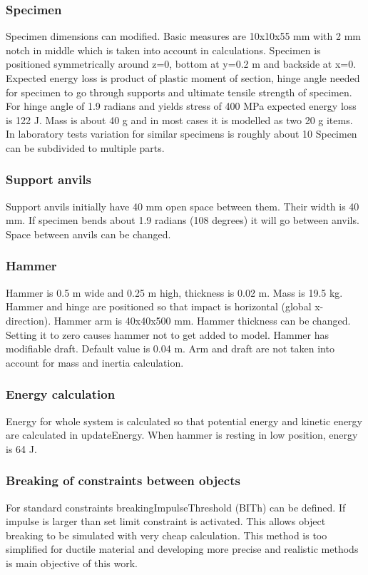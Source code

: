 \subsubsection{Specimen}
Specimen dimensions can modified. Basic measures are 10x10x55 mm with 2 mm notch in middle which is taken into account in calculations. Specimen is positioned symmetrically around z=0, bottom at y=0.2 m and backside at x=0. 
Expected energy loss is product of plastic moment of section, hinge angle needed for specimen to go through supports and 
ultimate tensile strength of specimen. For hinge angle of 1.9 radians and yields stress of 400 MPa expected energy 
loss is 122 J. Mass is about 40 g and in most cases it is modelled as two 20 g items. In laboratory tests variation for similar 
specimens is roughly about 10 %
Specimen can be subdivided to multiple parts.

\subsubsection{Support anvils}
Support anvils initially have 40 mm open space between them. Their width is 40 mm. 
If specimen bends about 1.9 radians (108 degrees) it will go between anvils. Space between anvils can be changed.

\subsubsection{Hammer}
Hammer is 0.5 m wide and 0.25 m high, thickness is 0.02 m. Mass is 19.5 kg. Hammer and hinge are positioned so that 
impact is horizontal  (global x-direction). Hammer arm is 40x40x500 mm. Hammer thickness can be changed.
Setting it to zero causes hammer not to get added to model. Hammer has modifiable draft. Default value is 0.04 m. 
Arm and draft are not taken into account for mass and inertia calculation.

\subsubsection{Energy calculation}

Energy for whole system is calculated so that potential energy and kinetic energy are calculated in updateEnergy. 
When hammer is resting in low position, energy is 64 J. 

\subsubsection{Breaking of constraints between objects}
For standard \bullet constraints breakingImpulseThreshold (BITh) can be defined. If impulse is larger than set limit constraint is activated. 
This allows object breaking to be simulated with very cheap calculation. 
This method is too simplified for ductile material and developing more precise and realistic methods is main objective of this work.  


